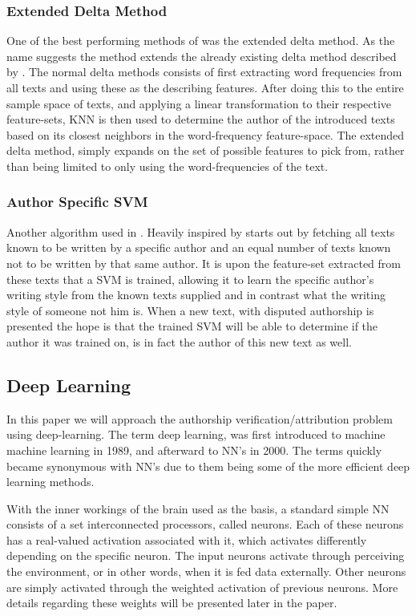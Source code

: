 \subsubsection{Extended Delta Method}

One of the best performing methods of \cite{US} was the extended delta method.
As the name suggests the method extends the already existing delta method
described by \cite{evert2015towards}. The normal delta methods consists of first
extracting word frequencies from all texts and using these as the describing
features. After doing this to the entire sample space of texts, and applying a
linear transformation to their respective feature-sets, \gls{KNN} is then used
to determine the author of the introduced texts based on its closest neighbors
in the word-frequency feature-space. The extended delta method, simply expands
on the set of possible features to pick from, rather than being limited to only
using the word-frequencies of the text.


\subsubsection{Author Specific SVM}

Another algorithm used in \cite{US}. Heavily inspired by \cite{hansen2014}
starts out by fetching all texts known to be written by a specific author and an
equal number of texts known not to be written by that same author. It is upon
the feature-set extracted from these texts that a \gls{SVM} is trained, allowing
it to learn the specific author's writing style from the known texts supplied
and in contrast what the writing style of someone not him is. When a new text,
with disputed authorship is presented the hope is that the trained \gls{SVM}
will be able to determine if the author it was trained on, is in fact the author
of this new text as well.


\subsection{Deep Learning}

In this paper we will approach the authorship verification/attribution problem
using deep-learning. The term deep learning, was first introduced to machine
machine learning in 1989, and afterward to \gls{NN}'s in 2000. The terms quickly
became synonymous with \gls{NN}'s due to them being some of the more efficient
deep learning methods.\cite{Schmidhuber:2015}

With the inner workings of the brain used as the basis, a standard simple
\gls{NN} consists of a set interconnected processors, called neurons. Each of
these neurons has a real-valued activation associated with it, which activates
differently depending on the specific neuron. The input neurons activate through
perceiving the environment, or in other words, when it is fed data externally.
Other neurons are simply activated through the weighted activation of previous
neurons. More details regarding these weights will be presented later in the
paper.\cite{DBLP:journals/corr/Schmidhuber14}

